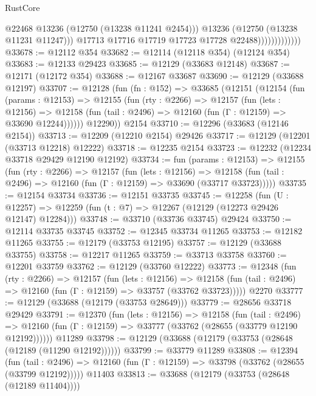 \begin{lexlean}{RustCore}
\begin{coremodule}
                                  @22468
                                  @13236
                                  (@12750 (@13238 @11241 @2454)))
                                @13236
                                (@12750 (@13238 @11231 @11247)))
                              @17713
                              @17716
                              @17719
                              @17723
                              @17728
                              @22488)))))))))))))
@33678 := @12112 @354
@33682 := @12114 (@12118 @354) (@12124 @354)
@33683 := @12133 @29423
@33685 := @12129 (@33683 @12148)
@33687 := @12171 (@12172 @354)
@33688 := @12167 @33687
@33690 := @12129 (@33688 @12197)
@33707 := @12128
    (fun (fn : @152) =>
    @33685
      (@12151
        (@12154
          (fun (params : @12153) =>
          @12155
            (fun (rty : @2266) =>
            @12157
              (fun (lets : @12156) =>
              @12158 (fun (tail : @2496) => @12160 (fun (Γ : @12159) => @33690 @12244))))))
        @12290))
    @2154
@33710 := @12296 (@33683 (@12146 @2154))
@33713 := @12209 (@12210 @2154) @29426
@33717 := @12129 (@12201 (@33713 @12218) @12222)
@33718 := @12235 @2154
@33723 := @12232 (@12234 @33718 @29429 @12190 @12192)
@33734 := fun (params : @12153) =>
  @12155
    (fun (rty : @2266) =>
    @12157
      (fun (lets : @12156) =>
      @12158 (fun (tail : @2496) => @12160 (fun (Γ : @12159) => @33690 (@33717 @33723)))))
@33735 := @12154 @33734
@33736 := @12151 @33735
@33745 := @12258
    (fun (U : @12257) => @12259 (fun (t : @7) => @12267 (@12129 (@12273 @29426 @12147) @12284)))
@33748 := @33710 (@33736 @33745) @29424
@33750 := @12114 @33735 @33745
@33752 := @12345 @33734 @11265
@33753 := @12182 @11265
@33755 := @12179 (@33753 @12195)
@33757 := @12129 (@33688 @33755)
@33758 := @12217 @11265
@33759 := @33713 @33758
@33760 := @12201 @33759
@33762 := @12129 (@33760 @12222)
@33773 := @12348
    (fun (rty : @2266) =>
    @12157
      (fun (lets : @12156) =>
      @12158 (fun (tail : @2496) => @12160 (fun (Γ : @12159) => @33757 (@33762 @33723)))))
    @2270
@33777 := @12129 (@33688 (@12179 (@33753 @28649)))
@33779 := @28656 @33718 @29429
@33791 := @12370
    (fun (lets : @12156) =>
    @12158
      (fun (tail : @2496) =>
      @12160 (fun (Γ : @12159) => @33777 (@33762 (@28655 (@33779 @12190 @12192))))))
    @11289
@33798 := @12129 (@33688 (@12179 (@33753 (@28648 (@12189 (@11290 @12192))))))
@33799 := @33779 @11289
@33808 := @12394
    (fun (tail : @2496) => @12160 (fun (Γ : @12159) => @33798 (@33762 (@28655 (@33799 @12192)))))
    @11403
@33813 := @33688 (@12179 (@33753 (@28648 (@12189 @11404))))

\end{coremodule}
\end{lexlean}
